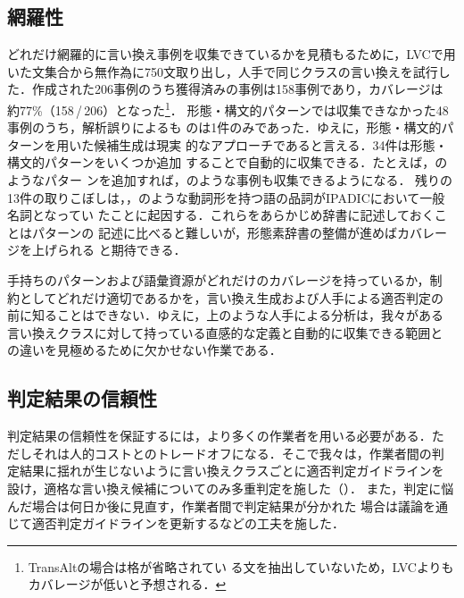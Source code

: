 \subsection{網羅性}
\label{ssec:exhaustiveness}

どれだけ網羅的に言い換え事例を収集できているかを見積もるために，LVCで用
いた文集合から無作為に750文取り出し，人手で同じクラスの言い換えを試行し
た．作成された206事例のうち獲得済みの事例は158事例であり，カバレージは
約77\%（158\,/\,206）となった\footnote{TransAltの場合は格が省略されてい
  る文を抽出していないため，LVCよりもカバレージが低いと予想される．}．
形態・構文的パターンでは収集できなかった48事例のうち，解析誤りによるも
のは1件のみであった．ゆえに，形態・構文的パターンを用いた候補生成は現実
的なアプローチであると言える．34件は形態・構文的パターンをいくつか追加
することで自動的に収集できる．たとえば，のようなパター
ンを追加すれば，のような事例も収集できるようになる．
残りの13件の取りこぼしは，，のような動詞形を持つ語の品詞がIPADICにおいて一般名詞となってい
たことに起因する．これらをあらかじめ辞書に記述しておくことはパターンの
記述に比べると難しいが，形態素辞書の整備が進めばカバレージを上げられる
と期待できる．

手持ちのパターンおよび語彙資源がどれだけのカバレージを持っているか，制
約としてどれだけ適切であるかを，言い換え生成および人手による適否判定の
前に知ることはできない．ゆえに，上のような人手による分析は，我々がある
言い換えクラスに対して持っている直感的な定義と自動的に収集できる範囲と
の違いを見極めるために欠かせない作業である．

\subsection{判定結果の信頼性}
\label{ssec:reliability}

判定結果の信頼性を保証するには，より多くの作業者を用いる必要がある．た
だしそれは人的コストとのトレードオフになる．そこで我々は，作業者間の判
定結果に揺れが生じないように言い換えクラスごとに適否判定ガイドラインを
設け，適格な言い換え候補についてのみ多重判定を施した（）．
また，判定に悩んだ場合は何日か後に見直す，作業者間で判定結果が分かれた
場合は議論を通じて適否判定ガイドラインを更新するなどの工夫を施した．


